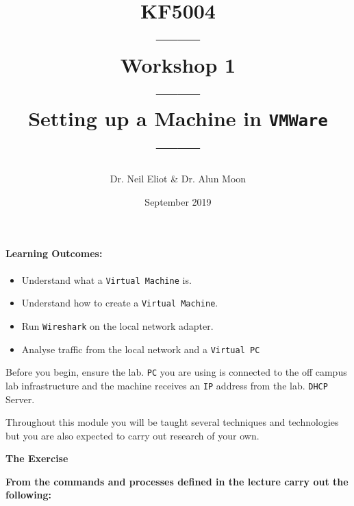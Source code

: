 \documentclass[11pt]{article}
\begin{document}
\author{Dr. Neil Eliot \& Dr. Alun Moon}
\title{KF5004\\------\\Workshop 1\\------\\Setting up a Machine in \texttt{VMWare}\\------}
\date{September 2019}
\maketitle

\newpage



\paragraph{Learning Outcomes:}
\begin{itemize}
\item Understand what a \texttt{Virtual Machine} is.
\item Understand how to create a \texttt{Virtual Machine}.
\item Run \texttt{Wireshark} on the local network adapter.
\item Analyse traffic from the local network and a \texttt{Virtual PC}
\end{itemize}


\begin{tcolorbox}[title={\textbf{Important:}}]
    Before you begin, ensure the lab. \texttt{PC} you are using is connected to the off campus lab infrastructure and the machine receives an \texttt{IP} address from the lab. \texttt{DHCP} Server.
\end{tcolorbox}
\begin{tcolorbox}[title={\textbf{Note:}}]
    \Large{Throughout this module you will be taught several techniques and technologies but you are also expected to carry out research of your own.}
\end{tcolorbox}
\newpage

\noindent\textbf{The Exercise}\\
\begin{tcolorbox}[colback=blue!20]
    \noindent\textbf{From the commands and processes defined in the lecture carry out the following:}
\end{tcolorbox}
\end{document}
